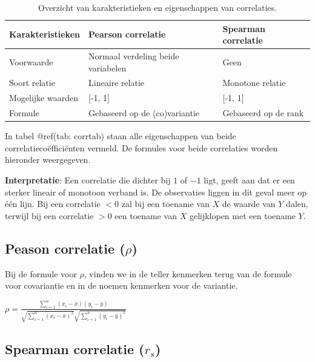 \documentclass[
]{book}
\theoremstyle{definition}
\theoremstyle{definition}
\theoremstyle{definition}
\theoremstyle{definition}
\theoremstyle{remark}
\begin{document}
\begin{table}

\caption{\label{tab:corrtab}Overzicht van karakteristieken en eigenschappen van correlaties.}
\centering
\begin{tabular}[t]{lll}
\toprule
Karakteristieken & Pearson correlatie & Spearman correlatie\\
\midrule
Voorwaarde & Normaal verdeling beide variabelen & Geen\\
Soort relatie & Lineaire relatie & Monotone relatie\\
Mogelijke waarden & {}[-1, 1] & {}[-1, 1]\\
Formule & Gebaseerd op de (co)variantie & Gebaseerd op de rank\\
\bottomrule
\end{tabular}
\end{table}

In tabel @ref(tab: corrtab) staan alle eigenschappen van beide correlatiecoëfficiënten vermeld. De formules voor beide correlaties worden hieronder weergegeven.

\textbf{Interpretatie}: Een correlatie die dichter bij \(1\) of \(-1\) ligt, geeft aan dat er een sterker lineair of monotoon verband is. De observaties liggen in dit geval meer op één lijn. Bij een correlatie \(< 0\) zal bij een toename van \(X\) de waarde van \(Y\) dalen, terwijl bij een correlatie \(> 0\) een toename van \(X\) gelijklopen met een toename \(Y\).

\hypertarget{peason-correlatie-rho}{%
\subsection{\texorpdfstring{Peason correlatie (\(\rho\))}{Peason correlatie (\textbackslash rho)}}\label{peason-correlatie-rho}}

Bij de formule voor \(\rho\), vinden we in de teller kenmerken terug van de formule voor covariantie en in de noemen kenmerken voor de variantie.

\(\rho = \frac{\sum^n_{i=1} (x_i-\bar{x})(y_i-\bar{y})}{\sqrt{\sum^n_{i=1}(x_i-\bar{x})^2} \sqrt{\sum^n_{i=1}(y_i-\bar{y})^2}}\)

\hypertarget{spearman-correlatie-r_s}{%
\subsection{\texorpdfstring{Spearman correlatie (\(r_s\))}{Spearman correlatie (r\_s)}}\label{spearman-correlatie-r_s}}
\end{document}
